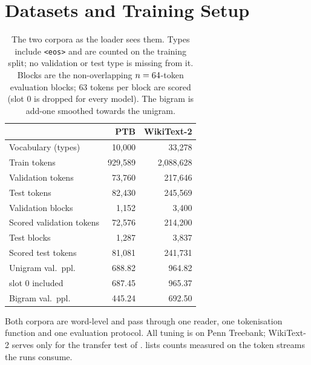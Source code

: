 \section{Datasets and Training Setup}
\label{app:datasets}

\begin{table}[t]
\centering
\small
\begin{tabular}{lrr}
\toprule
 & PTB & WikiText-2 \\
\midrule
Vocabulary (types)          & 10{,}000  & 33{,}278 \\
Train tokens                & 929{,}589 & 2{,}088{,}628 \\
Validation tokens           & 73{,}760  & 217{,}646 \\
Test tokens                 & 82{,}430  & 245{,}569 \\
\midrule
Validation blocks           & 1{,}152   & 3{,}400 \\
Scored validation tokens    & 72{,}576  & 214{,}200 \\
Test blocks                 & 1{,}287   & 3{,}837 \\
Scored test tokens          & 81{,}081  & 241{,}731 \\
\midrule
Unigram val.\ ppl.          & 688.82    & 964.82 \\
\quad slot $0$ included     & 687.45    & 965.37 \\
Bigram val.\ ppl.           & 445.24    & 692.50 \\
\bottomrule
\end{tabular}
\caption{The two corpora as the loader sees them. Types include \texttt{<eos>} and are counted
on the training split; no validation or test type is missing from it. Blocks are the
non-overlapping $n=64$-token evaluation blocks; $63$ tokens per block are scored (slot $0$
is dropped for every model). The bigram is add-one smoothed towards the unigram.}
\label{tab:datasets}
\end{table}

Both corpora are word-level and pass through one reader, one tokenisation function and one
evaluation protocol. All tuning is on Penn Treebank; WikiText-2 serves only for the transfer
test of .  lists counts measured on the token streams the
runs consume.


